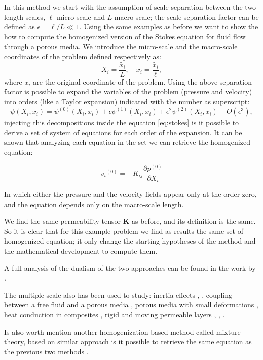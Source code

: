 In this method we start with the assumption of scale separation between the two length scales, $\ell$ micro-scale and $L$ macro-scale; the scale separation factor can be defined as $\epsilon = \ell/L \ll 1$.
Using the same examples as before we want to show the how to compute the homogenized version of the Stokes equation for fluid flow through a porous media.
We introduce the micro-scale and the macro-scale coordinates of the problem defined respectively as:
$$
 X_i = \dfrac{\tilde{x_i}}{L}, \quad   x_i = \dfrac{\tilde{x_i}}{\ell},
$$
where $x_i$ are the original coordinate of the problem.
Using the above separation factor is possible to expand the variables of the problem (pressure and velocity) into orders (like a Taylor expansion) indicated with the number as superscript:
$$
\psi(X_i, x_i) = \psi^{(0)}(X_i, x_i)  +\epsilon \psi^{(1)}(X_i, x_i) +\epsilon^2 \psi^{(2)}(X_i, x_i) +O(\epsilon^3),
$$
injecting this decompositions inside the equation \eqref{eq:stokes} is it possible to derive a set of system of equations for each order of the expansion.
It can be shown that analyzing each equation in the set we can retrieve the homogenized equation:

\begin{equation}
{v_i}^{(0)} = -K_{ij} \dfrac{\partial p^{(0)}}{\partial X_i}
\label{eq:darcy_ms}
\end{equation} 

In which either the pressure and the velocity fields appear only at the order zero, and the equation depends only on the macro-scale length.

We find the same permeability tensor $\mathbf{K}$ as before, and its definition is the same.
So it is clear that for this example problem we find as results the same set of homogenized equation; it only change the starting hypotheses of the method and the mathematical development to compute them.

A full analysis of the dualism of the two approaches can be found in the work by \citet{davit2013homogenization}.

The multiple scale also has been used to study: inertia effects \citet{mei1991effect}, \citet{skjetne1999new}, coupling between a free fluid and a porous media \citet{mikelic2000interface}, porous media with small deformations \citet{auriault1977etude}, heat conduction in composites \citet{auriault1983effective}, rigid and moving permeable layers \citet{zampogna2016fluid}, \citet{ugis}, \citet{zampogna2017pelskin}.

Is also worth mention another homogenization based method called mixture theory, based on similar approach is it possible to retrieve the same equation as the previous two methods \citet{rajagopal2007hierarchy}.


